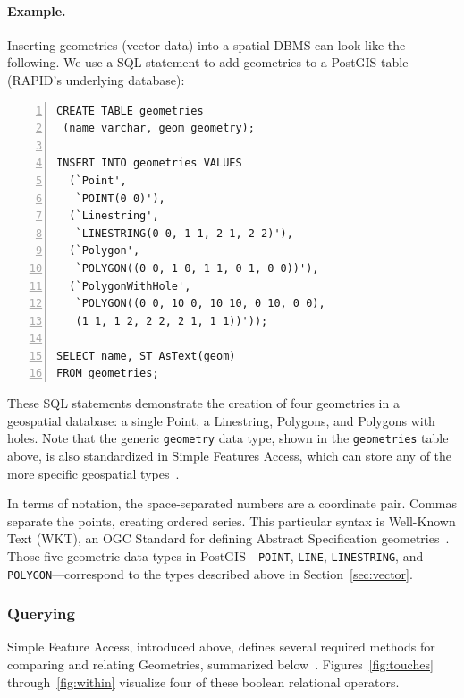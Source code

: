 \paragraph{Example.}
\label{background_wkt}
Inserting geometries (vector data) into a spatial DBMS can look like the following. We use a SQL statement to add geometries to a PostGIS table (RAPID's underlying database):

\begin{Verbatim}[samepage=true,baselinestretch=1,numbers=left,xleftmargin=12mm]
CREATE TABLE geometries
 (name varchar, geom geometry);

INSERT INTO geometries VALUES
  (`Point',
   `POINT(0 0)'),
  (`Linestring',
   `LINESTRING(0 0, 1 1, 2 1, 2 2)'),
  (`Polygon',
   `POLYGON((0 0, 1 0, 1 1, 0 1, 0 0))'),
  (`PolygonWithHole',
   `POLYGON((0 0, 10 0, 10 10, 0 10, 0 0),
   (1 1, 1 2, 2 2, 2 1, 1 1))'));

SELECT name, ST_AsText(geom)
FROM geometries;
\end{Verbatim}

These SQL statements demonstrate the creation of four geometries in a geospatial database: a single Point, a Linestring, Polygons, and Polygons with holes. Note that the generic \texttt{geometry} data type, shown in the \texttt{geometries} table above, is also standardized in Simple Features Access, which can store any of the more specific geospatial types~\cite{Boundless,SFA}.

In terms of notation, the space-separated numbers are a coordinate pair. Commas separate the points, creating ordered series. This particular syntax is Well-Known Text (WKT), an OGC Standard for defining Abstract Specification geometries~\cite{ogc}. Those five geometric data types in PostGIS---\texttt{POINT}, \texttt{LINE}, \texttt{LINESTRING}, and \texttt{POLYGON}---correspond to the types described above in Section~\ref{sec:vector}.

\subsubsection{Querying}
Simple Feature Access, introduced above, defines several required methods for comparing and relating Geometries, summarized below~\cite{SFA}. Figures~\ref{fig:touches} through~\ref{fig:within} visualize four of these boolean relational operators.


